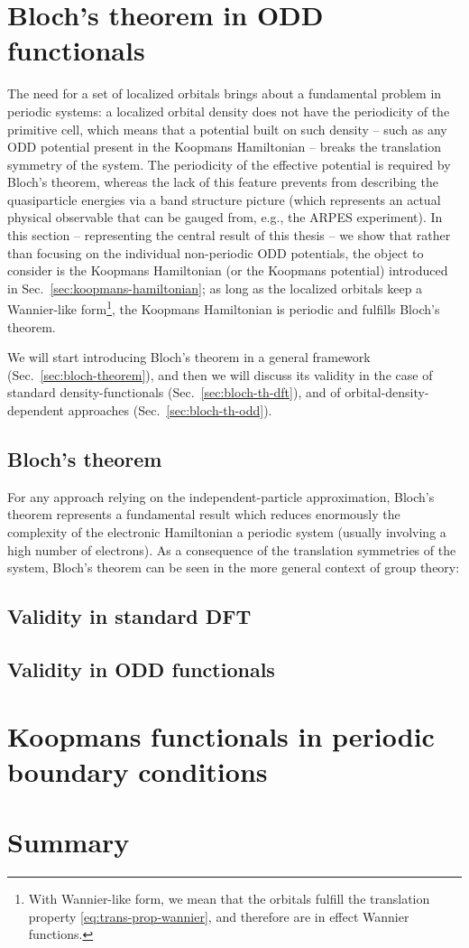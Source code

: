 \section{Bloch's theorem in ODD functionals\label{sec:bloch-theorem-section}}
The need for a set of localized orbitals brings about a fundamental problem in periodic systems: a localized orbital density does not have the periodicity of the primitive cell, which means that a potential built on such density -- such as any ODD potential present in the Koopmans Hamiltonian -- breaks the translation symmetry of the system. The periodicity of the effective potential is required by Bloch's theorem, whereas the lack of this feature prevents from describing the quasiparticle energies via a band structure picture (which represents an actual physical observable that can be gauged from, e.g., the ARPES experiment). In this section -- representing the central result of this thesis -- we show that rather than focusing on the individual non-periodic ODD potentials, the object to consider is the Koopmans Hamiltonian (or the Koopmans potential) introduced in Sec.~\ref{sec:koopmans-hamiltonian}; as long as the localized orbitals keep a Wannier-like form\footnote{With Wannier-like form, we mean that the orbitals fulfill the translation property \eqref{eq:trans-prop-wannier}, and therefore are in effect Wannier functions.}, the Koopmans Hamiltonian is periodic and fulfills Bloch's theorem.

We will start introducing Bloch's theorem in a general framework (Sec.~\ref{sec:bloch-theorem}), and then we will discuss its validity in the case of standard density-functionals (Sec.~\ref{sec:bloch-th-dft}), and of orbital-density-dependent approaches (Sec.~\ref{sec:bloch-th-odd}).

\subsection{Bloch's theorem\label{sec:bloch-theorem}}
For any approach relying on the independent-particle approximation, Bloch's theorem represents a fundamental result which reduces enormously the complexity of the electronic Hamiltonian a periodic system (usually involving a high number of electrons). As a consequence of the translation symmetries of the system, Bloch's theorem can be seen in the more general context of group theory: 


\subsection{Validity in standard DFT\label{sec:bloch-th-dft}}

\subsection{Validity in ODD functionals\label{sec:bloch-th-odd}}

\section{Koopmans functionals in periodic boundary conditions\label{sec:koopmans-pbc}}

\section{Summary\label{sec:ch4-summary}}

